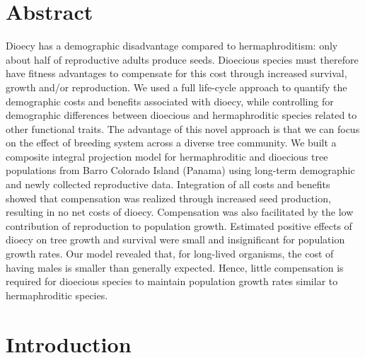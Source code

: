 \documentclass[b5paper,justified]{tufte-book} %
\begin{document}
\section{Abstract} 
\begin{fullwidth}
Dioecy has a demographic disadvantage compared to hermaphroditism: only about half of reproductive adults produce seeds. Dioecious species must therefore have fitness advantages to compensate for this cost through increased survival, growth and/or reproduction. We used a full life-cycle approach to quantify the demographic costs and benefits associated with dioecy, while controlling for demographic differences between dioecious and hermaphroditic species related to other functional traits. The advantage of this novel approach is that we can focus on the effect of breeding system across a diverse tree community. We built a composite integral projection model for hermaphroditic and dioecious tree populations from Barro Colorado Island (Panama) using long-term demographic and newly collected reproductive data. Integration of all costs and benefits showed that compensation was realized through increased seed production, resulting in no net costs of dioecy. Compensation was also facilitated by the low contribution of reproduction to population growth. Estimated positive effects of dioecy on tree growth and survival were small and insignificant for population growth rates. Our model revealed that, for long-lived organisms, the cost of having males is smaller than generally expected. Hence, little compensation is required for dioecious species to maintain population growth rates similar to hermaphroditic species.

\section{Introduction}


\end{fullwidth}
\end{document}
